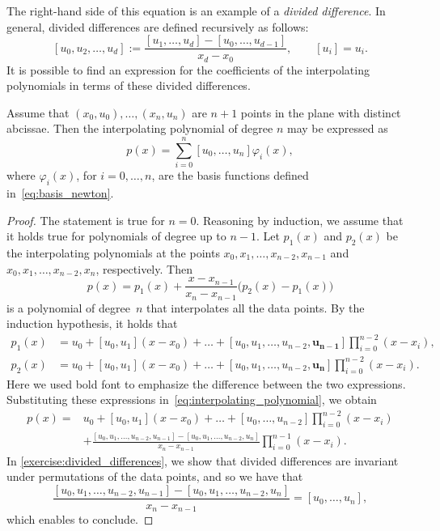 The right-hand side of this equation is an example of a \emph{divided difference}.
In general, divided differences are defined recursively as follows:
\[
    [u_{0}, u_{2}, \dotsc, u_{d}] := \frac{[u_{1}, \dotsc, u_{d}] - [u_{0}, \dotsc, u_{d-1}]}{x_{d}-x_{0}}, \qquad [u_i] = u_i.
\]
It is possible to find an expression for the coefficients of the interpolating polynomials in terms of these divided differences.
\begin{proposition}
    Assume that $(x_0, u_0), \dotsc, (x_n, u_n)$ are $n+1$ points in the plane with distinct abcissae.
    Then the interpolating polynomial of degree $n$ may be expressed as
    \[
        p(x) = \sum_{i=0}^{n} [u_0, \dotsc, u_n] \varphi_i(x),
    \]
    where $\varphi_i(x)$, for $i = 0, \dotsc, n$, are the basis functions defined in~\eqref{eq:basis_newton}.
\end{proposition}
\begin{proof}
    The statement is true for $n = 0$.
    Reasoning by induction, we assume that it holds true for polynomials of degree up to $n-1$.
    Let $p_1(x)$ and $p_2(x)$ be the interpolating polynomials at the points
    $x_0, x_1, \dotsc, x_{n-2}, x_{n-1}$ and $x_0, x_1, \dotsc, x_{n-2}, x_{n}$, respectively.
    Then
    \begin{equation}
        \label{eq:interpolating_polynomial}
        p(x) = p_1(x) + \frac{x - x_{n-1}}{x_n - x_{n-1}} \bigl(p_2(x) - p_1(x)\bigr)
    \end{equation}
    is a polynomial of degree~$n$ that interpolates all the data points.
    By the induction hypothesis,
    it holds that
    \begin{align*}
        p_1(x) &= u_0 + [u_0, u_1] (x - x_0) + \dotsc + [u_0, u_1, \dotsc, u_{n-2}, \mathbf{u_{n-1}}] \prod_{i=0}^{n-2} (x - x_i), \\
        p_2(x) &= u_0 + [u_0, u_1] (x - x_0) + \dotsc + [u_0, u_1, \dotsc, u_{n-2}, \mathbf{u_{n}}] \prod_{i=0}^{n-2} (x - x_i).
    \end{align*}
    Here we used bold font to emphasize the difference between the two expressions.
    Substituting these expressions in~\eqref{eq:interpolating_polynomial},
    we obtain
    \begin{align*}
        p(x) =
        &u_0 + [u_0, u_1] (x - x_0) + \dotsc + [u_0, \dotsc, u_{n-2}] \prod_{i=0}^{n-2} (x - x_i)  \\
        & + \frac{[u_0, u_1, \dotsc, u_{n-2}, u_{n-1}] - [u_0, u_1, \dotsc, u_{n-2}, u_{n}]}{x_n - x_{n-1}} \prod_{i=0}^{n-1} (x - x_i).
    \end{align*}
    In \cref{exercise:divided_differences},
    we show that divided differences are invariant under permutations of the data points,
    and so we have that
    \[
        \frac{[u_0, u_1, \dotsc, u_{n-2}, u_{n-1}] - [u_0, u_1, \dotsc, u_{n-2}, u_{n}]}{x_n - x_{n-1}} = [u_0, \dotsc, u_n],
    \]
    which enables to conclude.
\end{proof}
